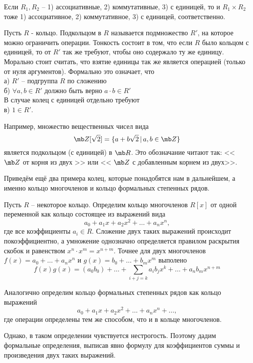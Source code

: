 \rm
Если $R_1,R_2$ -- 1) ассоциативные, 2) коммутативные, 3) с единицей, то и $R_1\times R_2$  тоже 1) ассоциативное, 2) коммутативное, 3) с единицей, соответственно.
\erm

\dfn[Подкольцо] Пусть $R$ - кольцо. Подкольцом в $R$ называется подмножество $R'$, на которое можно
ограничить операции. Тонкость состоит в том, что если $R$ было кольцом с единицей, то от $R'$ так же требуют, чтобы оно содержало ту же единицу. Морально стоит считать, что взятие единицы так же является операцией (только от нуля аргументов).
Формально это означает, что\\
а) $R'$ -- подгруппа $R$ по сложению\\
б) $\forall a,b\in R'$ должно быть верно $a\cdot b \in R'$ \\
В случае колец с единицей отдельно требуют\\
в) $1\in R'$.
\edfn



\rm Например, множество вещественных чисел вида 
$$\mb Z[\sqrt{2}]=\{a+b\sqrt{2}\,|\, a,b \in \mb Z\} $$
является подкольцом (с единицей) в $\mb R$. Это обозначание читают так: << $\mb Z$ от корня из двух >> или << $\mb Z$ с добавленным корнем из двух>>. 
\erm




Приведём ещё два примера колец, которые понадобятся нам в дальнейшем, а именно кольцо многочленов и кольцо
формальных степенных рядов.



 Пусть $R$ – некоторое кольцо. Определим кольцо многочленов $R[x]$ от
одной переменной как кольцо состоящее из выражений вида
$$a_0+a_1x+a_2x^2+\dots+a_nx^n,$$
где все коэффициенты $a_i\in R$. Сложение двух таких выражений происходит покоэффициентно, а умножение однозначно определяется правилом раскрытия скобок и равенством $x^n\cdot x^m=x^{n+m}.$ Точнее для двух многочленов $f(x)=a_0+\dots+a_nx^n$ и $g(x)=b_0+\dots+b_mx^m$ выполено
$$f(x)g(x)= (a_0b_0)+ \dots+\sum_{i+j=k}a_ib_j x^k+\dots+a_nb_mx^{n+m}$$
\edfn

 Аналогично определим кольцо формальных степенных рядов как кольцо выражений
$$a_0+a_1x+a_2x^2+\dots+a_nx^n+\dots,$$
где операции определены тем же способом, что и в кольце многочленов.
\edfn

Однако, в таком определении чувствуется нестрогость. Поэтому дадим формальные определения, выписав явно формулу для коэффициентов суммы и произведения двух таких выражений.

